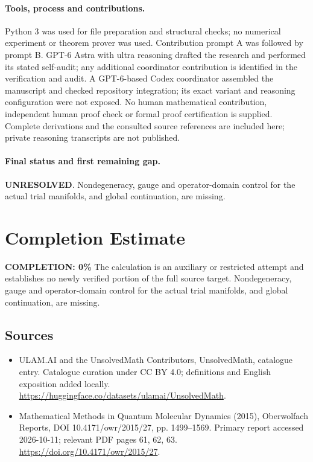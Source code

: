\documentclass[11pt]{article}
\begin{document}
\paragraph{Tools, process and contributions.}
Python 3 was used for file preparation and structural checks; no numerical experiment or theorem prover was used. Contribution prompt A was followed by prompt B. GPT-6 Astra with ultra reasoning drafted the research and performed its stated self-audit; any additional coordinator contribution is identified in the verification and audit. A GPT-6-based Codex coordinator assembled the manuscript and checked repository integration; its exact variant and reasoning configuration were not exposed. No human mathematical contribution, independent human proof check or formal proof certification is supplied. Complete derivations and the consulted source references are included here; private reasoning transcripts are not published.

\paragraph{Final status and first remaining gap.}
\textbf{UNRESOLVED}. Nondegeneracy, gauge and operator-domain control for the actual trial manifolds, and global continuation, are missing.

\section{Completion Estimate}
\noindent\textbf{COMPLETION: 0\%}
The calculation is an auxiliary or restricted attempt and establishes no newly verified portion of the full source target. Nondegeneracy, gauge and operator-domain control for the actual trial manifolds, and global continuation, are missing.

\subsection{Sources}
\begin{itemize}
\item[\hypertarget{source:statement:1}{S1}] ULAM.AI and the UnsolvedMath Contributors, UnsolvedMath, catalogue entry. Catalogue curation under CC BY 4.0; definitions and English exposition added locally.
\url{https://huggingface.co/datasets/ulamai/UnsolvedMath}.
\item[\hypertarget{source:statement:2}{S2}] Mathematical Methods in Quantum Molecular Dynamics (2015), Oberwolfach Reports, DOI 10.4171/owr/2015/27, pp. 1499--1569. Primary report accessed 2026-10-11; relevant PDF pages 61, 62, 63.
\url{https://doi.org/10.4171/owr/2015/27}.
\end{itemize}
\label{end:statement}
\end{document}

